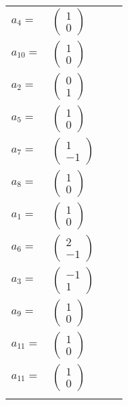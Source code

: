 \documentclass[1p]{elsarticle_modified}
\theoremstyle{definition}
\begin{document}
\begin{tabular}{m{7pt} m{180pt} m{7pt} m{180pt} }
\flushright $a_{4}=$&$\begin{pmatrix}1\\0\end{pmatrix}$ \\
\flushright $a_{10}=$&$\begin{pmatrix}1\\0\end{pmatrix}$ \\
\flushright $a_{2}=$&$\begin{pmatrix}0\\1\end{pmatrix}$ \\
\flushright $a_{5}=$&$\begin{pmatrix}1\\0\end{pmatrix}$ \\
\flushright $a_{7}=$&$\begin{pmatrix}1\\-1\end{pmatrix}$ \\
\flushright $a_{8}=$&$\begin{pmatrix}1\\0\end{pmatrix}$ \\
\flushright $a_{1}=$&$\begin{pmatrix}1\\0\end{pmatrix}$ \\
\flushright $a_{6}=$&$\begin{pmatrix}2\\-1\end{pmatrix}$ \\
\flushright $a_{3}=$&$\begin{pmatrix}-1\\1\end{pmatrix}$ \\
\flushright $a_{9}=$&$\begin{pmatrix}1\\0\end{pmatrix}$ \\
\flushright $a_{11}=$&$\begin{pmatrix}1\\0\end{pmatrix}$\\ \flushright $a_{11}=$&$\begin{pmatrix}1\\0\end{pmatrix}$\\&\end{tabular}
\end{document}
